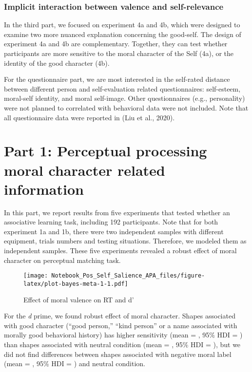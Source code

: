 \documentclass[
  english,
  man]{apa6}
\begin{document}
\hypertarget{implicit-interaction-between-valence-and-self-relevance}{%
\subsubsection{Implicit interaction between valence and self-relevance}\label{implicit-interaction-between-valence-and-self-relevance}}

In the third part, we focused on experiment 4a and 4b, which were designed to examine two more nuanced explanation concerning the good-self. The design of experiment 4a and 4b are complementary. Together, they can test whether participants are more sensitive to the moral character of the Self (4a), or the identity of the good character (4b).

For the questionnaire part, we are most interested in the self-rated distance between different person and self-evaluation related questionnaires: self-esteem, moral-self identity, and moral self-image. Other questionnaires (e.g., personality) were not planned to correlated with behavioral data were not included. Note that all questionnaire data were reported in (Liu et al., 2020).

\hypertarget{part-1-perceptual-processing-moral-character-related-information}{%
\section{Part 1: Perceptual processing moral character related information}\label{part-1-perceptual-processing-moral-character-related-information}}

In this part, we report results from five experiments that tested whether an associative learning task, including 192 participants. Note that for both experiment 1a and 1b, there were two independent samples with different equipment, trials numbers and testing situations. Therefore, we modeled them as independent samples. These five experiments revealed a robust effect of moral character on perceptual matching task.

\begin{figure}
\centering
\texttt{[image: Notebook\_Pos\_Self\_Salience\_APA\_files/figure-latex/plot-bayes-meta-1-1.pdf]}
\caption{\label{fig:plot-bayes-meta-1}Effect of moral valence on RT and d'}
\end{figure}

For the \emph{d} prime, we found robust effect of moral character. Shapes associated with good character (``good person,'' ``kind person'' or a name associated with morally good behavioral history) has higher sensitivity (mean = , 95\% HDI = ) than shapes associated with neutral condition (mean = , 95\% HDI = ), but we did not find differences between shapes associated with negative moral label (mean = , 95\% HDI = ) and neutral condition.
\end{document}

